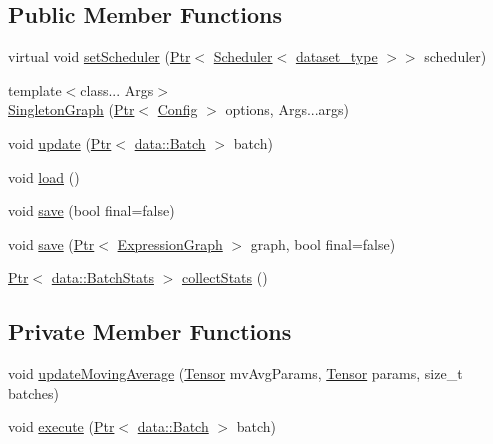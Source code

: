 \subsection*{Public Member Functions}
\begin{DoxyCompactItemize}
\item 
virtual void \hyperlink{classmarian_1_1SingletonGraph_a5d46b2cbb40e334e4885ce507fb2019b}{set\+Scheduler} (\hyperlink{namespacemarian_ad1a373be43a00ef9ce35666145137b08}{Ptr}$<$ \hyperlink{classmarian_1_1Scheduler}{Scheduler}$<$ \hyperlink{classmarian_1_1SingletonGraph_a6bb5603e1b8641cd65bd7b032cbecefd}{dataset\+\_\+type} $>$$>$ scheduler)
\item 
{\footnotesize template$<$class... Args$>$ }\\\hyperlink{classmarian_1_1SingletonGraph_a64ed90859cc12969682365c9dff9c8ae}{Singleton\+Graph} (\hyperlink{namespacemarian_ad1a373be43a00ef9ce35666145137b08}{Ptr}$<$ \hyperlink{classmarian_1_1Config}{Config} $>$ options, Args...\+args)
\item 
void \hyperlink{classmarian_1_1SingletonGraph_a4fdb7d93ca5e9d4b219a4dc8f761be0b}{update} (\hyperlink{namespacemarian_ad1a373be43a00ef9ce35666145137b08}{Ptr}$<$ \hyperlink{classmarian_1_1data_1_1Batch}{data\+::\+Batch} $>$ batch)
\item 
void \hyperlink{classmarian_1_1SingletonGraph_a0cd71fba2f6c9b6d41f043d3000270a7}{load} ()
\item 
void \hyperlink{classmarian_1_1SingletonGraph_ae1b4d1afb1be47551f76e9f7b75eb3d0}{save} (bool final=false)
\item 
void \hyperlink{classmarian_1_1SingletonGraph_a6c6c46e945ae75e779253a3623237b3b}{save} (\hyperlink{namespacemarian_ad1a373be43a00ef9ce35666145137b08}{Ptr}$<$ \hyperlink{classmarian_1_1ExpressionGraph}{Expression\+Graph} $>$ graph, bool final=false)
\item 
\hyperlink{namespacemarian_ad1a373be43a00ef9ce35666145137b08}{Ptr}$<$ \hyperlink{classmarian_1_1data_1_1BatchStats}{data\+::\+Batch\+Stats} $>$ \hyperlink{classmarian_1_1SingletonGraph_a1a06f75eecc4c6548bbdc55538c53f2c}{collect\+Stats} ()
\end{DoxyCompactItemize}
\subsection*{Private Member Functions}
\begin{DoxyCompactItemize}
\item 
void \hyperlink{classmarian_1_1SingletonGraph_a4d30a0f1e811e89be524666e3a197dac}{update\+Moving\+Average} (\hyperlink{namespacemarian_a88b71ec34bb354564cddc24eb80f7e14}{Tensor} mv\+Avg\+Params, \hyperlink{namespacemarian_a88b71ec34bb354564cddc24eb80f7e14}{Tensor} params, size\+\_\+t batches)
\item 
void \hyperlink{classmarian_1_1SingletonGraph_a857b38654fac79ce8a8b584deaf7525c}{execute} (\hyperlink{namespacemarian_ad1a373be43a00ef9ce35666145137b08}{Ptr}$<$ \hyperlink{classmarian_1_1data_1_1Batch}{data\+::\+Batch} $>$ batch)
\end{DoxyCompactItemize}
